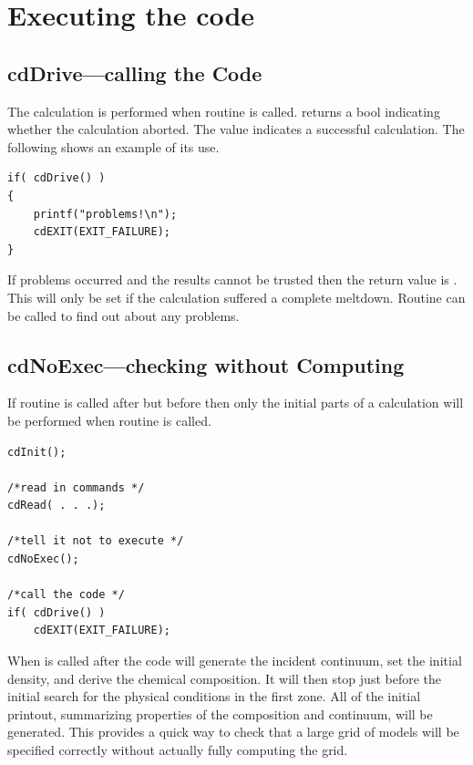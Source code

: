 \section{Executing the code}

\subsection{cdDrive---calling the Code}

The calculation is performed when routine  is called.
returns a bool indicating whether the calculation aborted.
The value
 indicates a successful calculation.
The following shows an example of
its use.
\begin{verbatim}
if( cdDrive() )
{
    printf("problems!\n");
    cdEXIT(EXIT_FAILURE);
}
\end{verbatim}

If problems occurred and the results cannot be trusted then the return
value is .  This will only be set if the calculation suffered a
complete meltdown.  Routine  can be called to
find out about any problems.

\subsection{cdNoExec---checking without Computing}

If routine  is called after 
but before  then only
the initial parts of a calculation will be performed when routine
is called.
\begin{verbatim}
cdInit();

/*read in commands */
cdRead( . . .);

/*tell it not to execute */
cdNoExec();

/*call the code */
if( cdDrive() )
    cdEXIT(EXIT_FAILURE);
\end{verbatim}

When  is called after  the code will generate the incident
continuum, set the initial density, and derive the chemical composition.
It will then stop just before the initial search for the physical conditions
in the first zone.  All of the initial printout, summarizing properties
of the composition and continuum, will be generated.  This provides a quick
way to check that a large grid of models will be specified correctly without
actually fully computing the grid.

